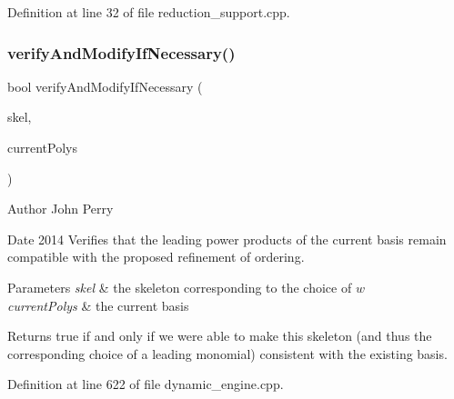 Definition at line 32 of file reduction\+\_\+support.\+cpp.

\mbox{\label{group___g_b_computation_ga7d0ce10bf904206db71f7e011ba551b3}} 
\subsubsection{\texorpdfstring{verify\+And\+Modify\+If\+Necessary()}{verifyAndModifyIfNecessary()}}
{\footnotesize\ttfamily bool verify\+And\+Modify\+If\+Necessary (\begin{DoxyParamCaption}\item[{\hyperlink{group___c_l_s_solvers_class_l_p___solver}{L\+P\+\_\+\+Solver} $\ast$}]{skel,  }\item[{const list$<$ \hyperlink{group__polygroup_class_abstract___polynomial}{Abstract\+\_\+\+Polynomial} $\ast$$>$ \&}]{current\+Polys }\end{DoxyParamCaption})}

\begin{DoxyAuthor}{Author}
John Perry 
\end{DoxyAuthor}
\begin{DoxyDate}{Date}
2014 Verifies that the leading power products of the current basis remain compatible with the proposed refinement of ordering. 
\end{DoxyDate}

\begin{DoxyParams}{Parameters}
{\em skel} & the skeleton corresponding to the choice of $w$ \\
\hline
{\em current\+Polys} & the current basis \\
\hline
\end{DoxyParams}
\begin{DoxyReturn}{Returns}
{\ttfamily true} if and only if we were able to make this skeleton (and thus the corresponding choice of a leading monomial) consistent with the existing basis. 
\end{DoxyReturn}


Definition at line 622 of file dynamic\+\_\+engine.\+cpp.

